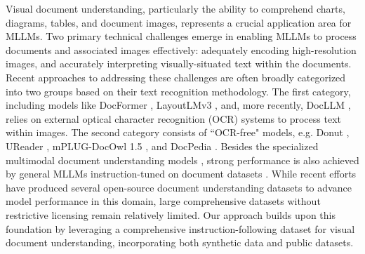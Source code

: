 Visual document understanding, particularly the ability to comprehend charts, diagrams, tables, and document images, represents a crucial application area for MLLMs. 
Two primary technical challenges emerge in enabling MLLMs to process documents and associated images effectively: adequately encoding high-resolution images, and accurately interpreting visually-situated text within the documents. Recent approaches to addressing these challenges are often broadly categorized into two groups based on their text recognition methodology.
The first category, including models like DocFormer \citep{appalaraju2021docformer}, LayoutLMv3 \citep{huang2022layoutlmv3}, and, more recently, DocLLM \citep{wang2023docllm}, relies on external optical character recognition (OCR) systems to process text within images. The second category consists of ``OCR-free" models, e.g. Donut \citep{kim2022ocrfreedocumentunderstandingtransformer}, UReader \citep{ye2023ureader}, mPLUG-DocOwl 1.5 \citep{hu2024mplugdocowl15}, and DocPedia \citep{feng2024docpedia}.
Besides the specialized multimodal document understanding models \citep{liao2024doclayllm, liu2024hrvda}, strong performance is also achieved by general MLLMs instruction-tuned on document datasets \citep{li2024llavaonevision, dai2024nvlm}. 
While recent efforts \citep{mathew2021docvqa, huggingface_docmatix, rodriguez2024bigdocs} have produced several open-source document understanding datasets to advance model performance in this domain, large comprehensive datasets without restrictive licensing remain relatively limited.
Our approach builds upon this foundation by leveraging a comprehensive instruction-following dataset for visual document understanding, incorporating both synthetic data and public datasets.



%